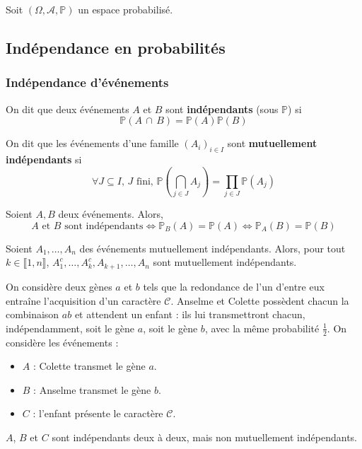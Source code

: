 




  Soit $(\Omega, \mathcal{A}, \mathbb{P})$ un espace probabilisé.

  \subsection{Indépendance en probabilités}

  \subsubsection{Indépendance d'événements}


  \begin{definition}
    On dit que deux événements $A$ et $B$ sont \textbf{indépendants} (sous $\mathbb{P}$) si
    \[ \mathbb{P}(A \, \cap \, B) = \mathbb{P}(A) \mathbb{P}(B) \]
  \end{definition}

  \begin{definition}
    On dit que les événements d'une famille $(A_i)_{i \in I}$ sont \textbf{mutuellement indépendants} si
    \[ \forall J \subseteq I, \, J \text{ fini}, \, \mathbb{P}\left( \bigcap_{j \in J} A_j \right) = \prod_{j \in J} \mathbb{P}(A_j) \]
  \end{definition}


  \begin{proposition}
    Soient $A, B$ deux événements. Alors,
    \[ A \text{ et } B \text{ sont indépendants} \iff \mathbb{P}_B(A) = \mathbb{P}(A) \iff \mathbb{P}_A(B) = \mathbb{P}(B) \]
  \end{proposition}

  \begin{proposition}
    Soient $A_1, \dots, A_n$ des événements mutuellement indépendants. Alors, pour tout $k \in \llbracket 1, n \rrbracket$, $A_1^c, \dots, A_k^c, A_{k+1}, \dots, A_n$ sont mutuellement indépendants.
  \end{proposition}

  \begin{example}
    On considère deux gènes $a$ et $b$ tels que la redondance de l'un d'entre eux entraîne l'acquisition d'un caractère $\mathcal{C}$. Anselme et Colette possèdent chacun la combinaison $ab$ et attendent un enfant : ils lui transmettront chacun, indépendamment, soit le gène $a$, soit le gène $b$, avec la même probabilité $\frac{1}{2}$. On considère les événements :
    \begin{itemize}
      \item $A$ : Colette transmet le gène $a$.
      \item $B$ : Anselme transmet le gène $b$.
      \item $C$ : l'enfant présente le caractère $\mathcal{C}$.
    \end{itemize}
    $A$, $B$ et $C$ sont indépendants deux à deux, mais non mutuellement indépendants.
  \end{example}

